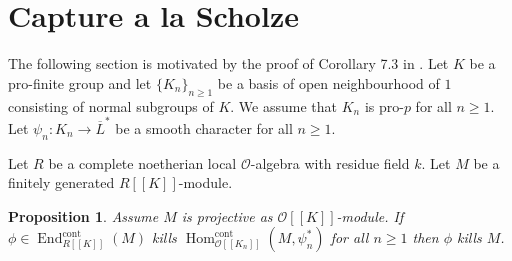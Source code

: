 \documentclass[11pt]{article}
\let\mathcal\mathscr
\newtheorem{prop}{Proposition}[section]
\theoremstyle{definition}
\DeclareMathOperator{\End}{End}
\DeclareMathOperator{\Hom}{Hom}
\newcommand{\br}[1]{[\![#1]\!]}
\newcommand{\cO}{\mathcal{O}}
\newcommand{\cont}{\mathrm{cont}}
\begin{document}
\section{Capture a la Scholze}\label{sec_scholze}

The following section is motivated by the proof of Corollary 7.3 in \cite{scholze}. Let $K$ be a pro-finite group and let $\{K_n\}_{n\ge 1}$ be a basis of open neighbourhood of
$1$ consisting of normal subgroups of $K$. We assume that $K_n$ is pro-$p$ for all $n\ge 1$. Let
$\psi_n: K_n \to \overline{L}^*$ be a smooth character for all $n\ge 1$.

Let $R$ be a complete noetherian local $\cO$-algebra with residue field $k$. Let $M$ be a
finitely generated $R\br{K}$-module.

\begin{prop}\label{easy_does_it} Assume $M$ is projective as $\cO\br{K}$-module. If $\phi\in\End^{\cont}_{R\br{K}}(M)$ kills $\Hom_{\cO\br{K_n}}^{\cont}(M, \psi_n^*)$ for all $n\ge 1$ then
$\phi$ kills $M$.
\end{prop}
\end{document}
